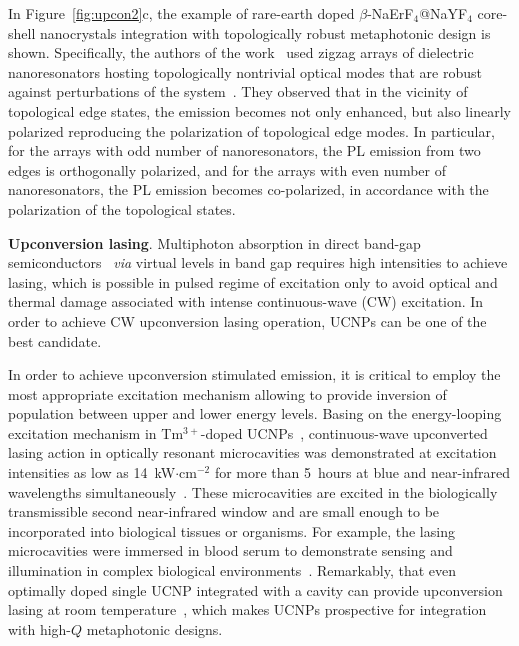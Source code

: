 \documentclass[journal=chreay,manuscript=review]{achemso}
\begin{document}
In Figure~\ref{fig:upcon2}c, the example of rare-earth doped $\beta$-NaErF$_4$@NaYF$_4$ core-shell nanocrystals integration with topologically robust metaphotonic design is shown. 
 Specifically, the authors of the work~\cite{tripathi2021topological} used zigzag arrays of dielectric nanoresonators hosting topologically nontrivial optical modes that are robust against perturbations of the system~\cite{kruk2019nonlinear}. They observed that in the vicinity of topological edge states, the emission becomes not only enhanced, but also linearly polarized reproducing the polarization of topological edge modes. In particular, for the arrays with odd number of nanoresonators, the PL emission from two edges is orthogonally polarized, and for the arrays with even number of nanoresonators, the PL emission becomes co-polarized, in accordance with the polarization of the topological states. 

{\bf Upconversion lasing}. Multiphoton absorption in direct band-gap semiconductors~\cite{guzelturk2014amplified,li2015ultralow, zhou2021perovskites} \textit{via} virtual levels in band gap requires high intensities to achieve lasing, which is possible in pulsed regime of excitation only to avoid optical and thermal damage associated with intense continuous-wave (CW) excitation. In order to achieve CW upconversion lasing operation, UCNPs can be one of the best candidate. 

In order to achieve upconversion stimulated emission, it is critical to employ the most appropriate excitation mechanism allowing to provide inversion of population between upper and lower energy levels. Basing on the energy-looping excitation mechanism in Tm$^{3+}$-doped UCNPs~\cite{levy2016energy}, continuous-wave upconverted lasing action in optically resonant microcavities was demonstrated at excitation intensities as low as 14~kW$\cdot$cm$^{-2}$ for more than 5~hours at blue and near-infrared wavelengths simultaneously~\cite{fernandez2018continuous}. These microcavities are excited in the biologically transmissible second near-infrared window and are small enough to be incorporated into biological tissues or organisms. For example, the lasing microcavities were immersed in blood serum to demonstrate sensing and illumination in complex biological environments~\cite{fernandez2018continuous}. Remarkably, that even optimally doped single UCNP integrated with a cavity can provide upconversion lasing at room temperature~\cite{shang2020low}, which makes UCNPs prospective for integration with high-$Q$ metaphotonic designs.
\end{document}
